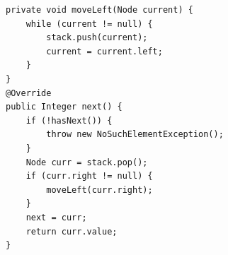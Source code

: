 \documentclass[a4paper,11pt]{article}
\newenvironment{code}{\captionsetup{type=listing}}{}
\begin{document}
\begin{code}
    \label{code:iterator}
    \begin{verbatim}
private void moveLeft(Node current) {
    while (current != null) {
        stack.push(current);
        current = current.left;
    }
}
@Override
public Integer next() {
    if (!hasNext()) {
        throw new NoSuchElementException();
    }
    Node curr = stack.pop();
    if (curr.right != null) {
        moveLeft(curr.right);
    }
    next = curr;
    return curr.value;
}
\end{verbatim}
\end{code}
\end{document}
